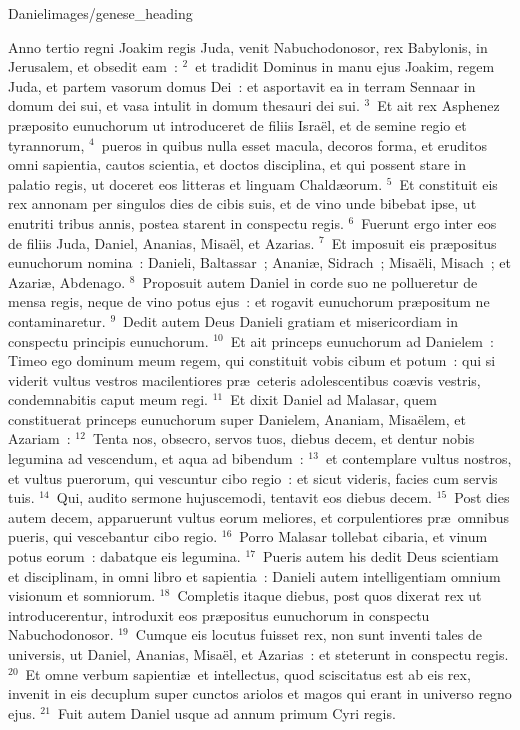 {Daniel}{images/genese_heading}


\lettrine[lines=10,image=true,loversize=0.05,lraise=-0.03]{A}{}nno tertio regni Joakim regis Juda, venit Nabuchodonosor, rex Babylonis, in Jerusalem, et obsedit eam~:
${}^{2}$~et tradidit Dominus in manu ejus Joakim, regem Juda, et partem vasorum domus Dei~: et asportavit ea in terram Sennaar in domum dei sui, et vasa intulit in domum thesauri dei sui.
${}^{3}$~Et ait rex Asphenez pr\ae posito eunuchorum ut introduceret de filiis Isra\"el, et de semine regio et tyrannorum,
${}^{4}$~pueros in quibus nulla esset macula, decoros forma, et eruditos omni sapientia, cautos scientia, et doctos disciplina, et qui possent stare in palatio regis, ut doceret eos litteras et linguam Chald\ae orum.
${}^{5}$~Et constituit eis rex annonam per singulos dies de cibis suis, et de vino unde bibebat ipse, ut enutriti tribus annis, postea starent in conspectu regis.
${}^{6}$~Fuerunt ergo inter eos de filiis Juda, Daniel, Ananias, Misa\"el, et Azarias.
${}^{7}$~Et imposuit eis pr\ae positus eunuchorum nomina~: Danieli, Baltassar~; Anani\ae , Sidrach~; Misa\"eli, Misach~; et Azari\ae , Abdenago.
${}^{8}$~Proposuit autem Daniel in corde suo ne pollueretur de mensa regis, neque de vino potus ejus~: et rogavit eunuchorum pr\ae positum ne contaminaretur.
${}^{9}$~Dedit autem Deus Danieli gratiam et misericordiam in conspectu principis eunuchorum.
${}^{10}$~Et ait princeps eunuchorum ad Danielem~: Timeo ego dominum meum regem, qui constituit vobis cibum et potum~: qui si viderit vultus vestros macilentiores pr\ae\ ceteris adolescentibus co\ae vis vestris, condemnabitis caput meum regi.
${}^{11}$~Et dixit Daniel ad Malasar, quem constituerat princeps eunuchorum super Danielem, Ananiam, Misa\"elem, et Azariam~:
${}^{12}$~Tenta nos, obsecro, servos tuos, diebus decem, et dentur nobis legumina ad vescendum, et aqua ad bibendum~:
${}^{13}$~et contemplare vultus nostros, et vultus puerorum, qui vescuntur cibo regio~: et sicut videris, facies cum servis tuis.
${}^{14}$~Qui, audito sermone hujuscemodi, tentavit eos diebus decem.
${}^{15}$~Post dies autem decem, apparuerunt vultus eorum meliores, et corpulentiores pr\ae\ omnibus pueris, qui vescebantur cibo regio.
${}^{16}$~Porro Malasar tollebat cibaria, et vinum potus eorum~: dabatque eis legumina.
${}^{17}$~Pueris autem his dedit Deus scientiam et disciplinam, in omni libro et sapientia~: Danieli autem intelligentiam omnium visionum et somniorum.
${}^{18}$~Completis itaque diebus, post quos dixerat rex ut introducerentur, introduxit eos pr\ae positus eunuchorum in conspectu Nabuchodonosor.
${}^{19}$~Cumque eis locutus fuisset rex, non sunt inventi tales de universis, ut Daniel, Ananias, Misa\"el, et Azarias~: et steterunt in conspectu regis.
${}^{20}$~Et omne verbum sapienti\ae\ et intellectus, quod sciscitatus est ab eis rex, invenit in eis decuplum super cunctos ariolos et magos qui erant in universo regno ejus.
${}^{21}$~Fuit autem Daniel usque ad annum primum Cyri regis.

